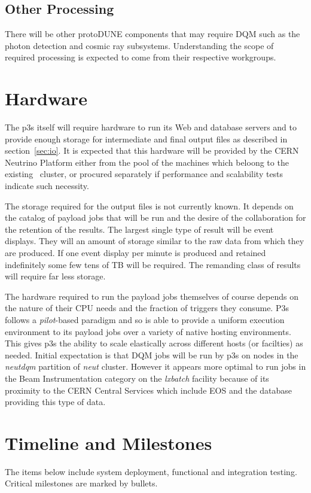 \documentclass[pdftex,12pt,letter]{article}
\newcommand{\pd}{protoDUNE\xspace}
\begin{document}
\subsection{Other Processing}
There will be other \pd components that may require DQM such as the photon detection
and cosmic ray subsystems. Understanding the scope of required processing is expected
to come from their respective workgroups.

\section{Hardware}
\label{sec:hardware}
The p3s itself will require hardware to run its Web and database
servers and to provide enough storage for intermediate and final
output files as described in section~\ref{sec:io}.  It is expected
that this hardware will be provided by the CERN Neutrino Platform
either from the pool of the machines which beloong to the
existing~\cite{neut} cluster, or procured separately if performance
and scalability tests indicate such necessity.


The storage required for the output files is not currently known.  It
depends on the catalog of payload jobs that will be run and the desire
of the collaboration for the retention of the results.  The largest
single type of result will be event displays.  They will an amount of
storage similar to the raw data from which they are produced.  If one
event display per minute is produced and retained indefinitely some
few tens of TB will be required.  The remanding class of results will
require far less storage.

The hardware required to run the payload jobs themselves of course
depends on the nature of their CPU needs and the fraction of triggers
they consume.  P3s follows a \textit{pilot}-based paradigm and so is
able to provide a uniform execution environment to its payload jobs
over a variety of native hosting environments.  This gives p3s the ability
to scale elastically across different hosts (or facilties) as needed.  Initial expectation
is that DQM jobs will be run by p3s on nodes in the \textit{neutdqm}
partition of \textit{neut} cluster. However it appears more optimal
to run jobs in the Beam Instrumentation category on the
\textit{lxbatch} \cite{lxbatch} facility because of its proximity to
the CERN Central Services which include EOS and the database
providing this type of data.

\section{Timeline and Milestones}
\label{sec:timeline}
The items below include system deployment, functional and integration testing.
Critical milestones are marked by bullets.
\end{document}
